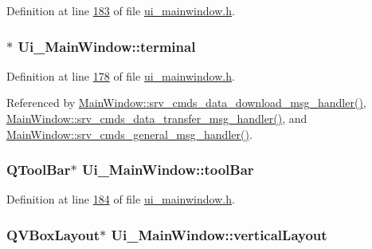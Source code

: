 Definition at line \hyperlink{a00052_source_l00183}{183} of file \hyperlink{a00052_source}{ui\+\_\+mainwindow.\+h}.

\hypertarget{a00027_aae71c46ea4546df5994735dee573b2dd}{
\subsubsection[{terminal}]{$\ast$ Ui\+\_\+\+Main\+Window\+::terminal}}\label{a00027_aae71c46ea4546df5994735dee573b2dd}


Definition at line \hyperlink{a00052_source_l00178}{178} of file \hyperlink{a00052_source}{ui\+\_\+mainwindow.\+h}.



Referenced by \hyperlink{a00049_source_l00588}{Main\+Window\+::srv\+\_\+cmds\+\_\+data\+\_\+download\+\_\+msg\+\_\+handler()}, \hyperlink{a00049_source_l00437}{Main\+Window\+::srv\+\_\+cmds\+\_\+data\+\_\+transfer\+\_\+msg\+\_\+handler()}, and \hyperlink{a00049_source_l00293}{Main\+Window\+::srv\+\_\+cmds\+\_\+general\+\_\+msg\+\_\+handler()}.

\hypertarget{a00027_ab84dc49349f514d7b7d3fe8e78de069b}{
\subsubsection[{tool\+Bar}]{\setlength{\rightskip}{0pt plus 5cm}Q\+Tool\+Bar$\ast$ Ui\+\_\+\+Main\+Window\+::tool\+Bar}}\label{a00027_ab84dc49349f514d7b7d3fe8e78de069b}


Definition at line \hyperlink{a00052_source_l00184}{184} of file \hyperlink{a00052_source}{ui\+\_\+mainwindow.\+h}.

\hypertarget{a00027_aecd96a04789fcfec3f98d80390ad8184}{
\subsubsection[{vertical\+Layout}]{\setlength{\rightskip}{0pt plus 5cm}Q\+V\+Box\+Layout$\ast$ Ui\+\_\+\+Main\+Window\+::vertical\+Layout}}\label{a00027_aecd96a04789fcfec3f98d80390ad8184}


